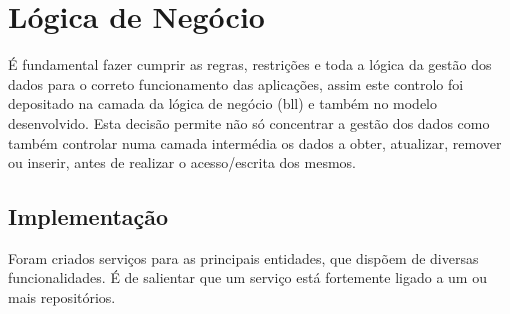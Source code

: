 %
%
\section{Lógica de Negócio}\label{sec34}

É fundamental fazer cumprir as regras, restrições e toda a lógica da gestão dos dados para o correto funcionamento das aplicações, assim  este controlo foi depositado na camada da lógica de negócio (\acrshort{bll}) e também no modelo desenvolvido. Esta decisão permite não só concentrar a gestão dos dados como também controlar numa camada intermédia os dados a obter, atualizar, remover ou inserir, antes de realizar o acesso/escrita dos mesmos. 

\subsection{Implementação}\label{subsec341}
 
 Foram criados serviços para as principais entidades, que dispõem de diversas funcionalidades. É de salientar que um serviço está fortemente ligado a um ou mais repositórios. 